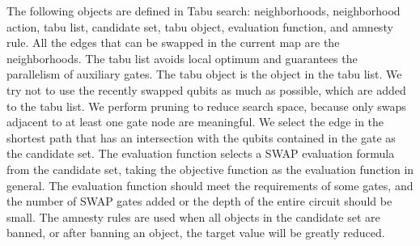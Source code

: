 \documentclass[runningheads]{llncs}
\begin{document}
The following objects are defined in Tabu search: neighborhoods, neighborhood action, tabu list, candidate set, tabu object, evaluation function, and amnesty rule. All the edges that can be swapped in the current map are the neighborhoods. The tabu list avoids local optimum and guarantees the parallelism of auxiliary gates. The tabu object is the object in the tabu list. We try not to use the recently swapped qubits as much as possible, which are added to the tabu list. We perform pruning to reduce search space, because only swaps adjacent to at least one gate node are meaningful. We select the edge in the shortest path that has an intersection with the qubits contained in the gate as the candidate set. The evaluation function selects a SWAP evaluation formula from the candidate set, 
 taking the objective function as the evaluation function in general. The evaluation function should meet the requirements of some gates, 
and the number of SWAP gates added or the depth of the entire circuit should be small. The amnesty rules are used when all objects in the candidate set are banned,  or after banning an object, the target value will be greatly reduced.
\end{document}

